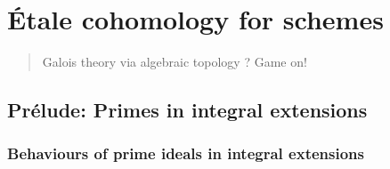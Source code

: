 \chapter{\'Etale cohomology for schemes} \label{chapter: etale_cohomology_1}
    \begin{abstract}
        Galois theory via algebraic topology ? Game on!
    \end{abstract}
    
    \minitoc
    
    \section{Pr\'elude: Primes in integral extensions}
        \subsection{Behaviours of prime ideals in integral extensions}
